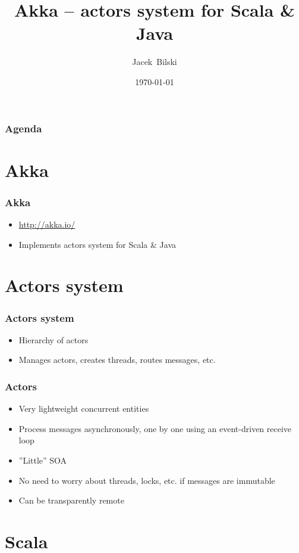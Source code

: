 \documentclass[xcolor=dvipsnames]{beamer}
\title{Akka -- actors system for Scala \& Java}
\author{Jacek~Bilski}
\date{\today}
\begin{document}
\begin{frame}
\titlepage
\end{frame}

\begin{frame}
\frametitle{Agenda}
\tableofcontents[pausesections]
\end{frame}

\section{Akka}

\begin{frame}
\frametitle{Akka}
\begin{itemize}
\item \href{http://akka.io/}{http://akka.io/}
\item Implements actors system for Scala \& Java
\end{itemize}
\end{frame}


\section{Actors system}

\begin{frame}
\frametitle{Actors system}
\begin{itemize}
\item Hierarchy of actors
\item Manages actors, creates threads, routes messages, etc.
\end{itemize}
\end{frame}

\begin{frame}
\frametitle{Actors}
\begin{itemize}
\item Very lightweight concurrent entities
\item Process messages asynchronously, one by one using an event-driven receive loop
\item ''Little'' SOA
\item No need to worry about threads, locks, etc. if messages are immutable
\item Can be transparently remote
\end{itemize}
\end{frame}


\section{Scala}
\end{document}
